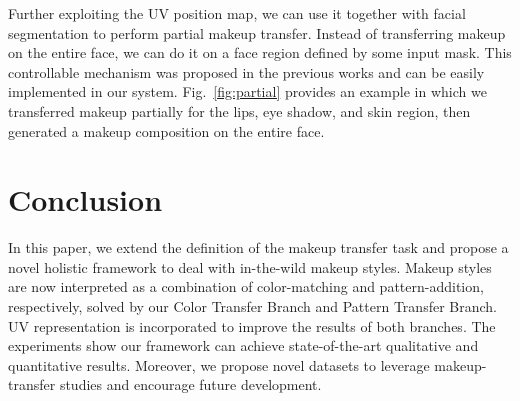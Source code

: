 \documentclass[final]{cvpr}
\newcommand{\Fref}[1]{Fig.~\ref{#1}}
\begin{document}
 Further exploiting the UV position map, we can use it together with facial segmentation to perform partial makeup transfer. Instead of transferring makeup on the entire face, we can do it on a face region defined by some input mask. This controllable mechanism was proposed in the previous works \cite{beautyglow,jiang2019psgan} and can be easily implemented in our system. \Fref{fig:partial} provides an example in which we transferred makeup partially for the lips, eye shadow, and skin region, then generated a makeup composition on the entire face. 



\section{Conclusion}
\vspace{-2mm}
In this paper, we extend the definition of the makeup transfer task and propose a novel holistic framework to deal with in-the-wild makeup styles. Makeup styles are now interpreted as a combination of color-matching and pattern-addition, respectively, solved by our Color Transfer Branch and Pattern Transfer Branch. UV representation is incorporated to improve the results of both branches. The experiments show our framework can achieve state-of-the-art qualitative and quantitative results. Moreover, we propose novel datasets to leverage  makeup-transfer studies and encourage future development.

{\small
\setlength{\bibsep}{0pt}

\setlength{\bibsep}{0pt}

}
\end{document}
